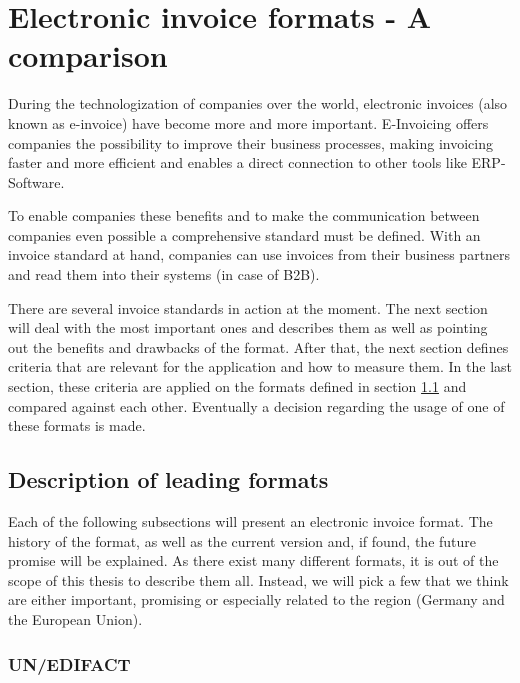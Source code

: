 %
% 
\chapter{Electronic invoice formats - A comparison}
\label{cha2}

During the technologization of companies over the world, electronic invoices (also known as e-invoice) have become more and more important. E-Invoicing offers companies the possibility to improve their business processes, making invoicing faster and more efficient and enables a direct connection to other tools like ERP-Software. 

To enable companies these benefits and to make the communication between companies even possible a comprehensive standard must be defined. With an invoice standard at hand, companies can use invoices from their business partners and read them into their systems (in case of B2B). 

There are several invoice standards in action at the moment. The next section will deal with the most important ones and describes them as well as pointing out the benefits and drawbacks of the format.
After that, the next section defines criteria that are relevant for the application and how to measure them.
In the last section, these criteria are applied on the formats defined in section \ref{sec2.1} and compared against each other. Eventually a decision regarding the usage of one of these formats is made.

\section{Description of leading formats}
\label{sec2.1}

Each of the following subsections will present an electronic invoice format. The history of the format, as well as the current version and, if found, the future promise will be explained. As there exist many different formats, it is out of the scope of this thesis to describe them all. Instead, we will pick a few that we think are either important, promising or especially related to the region (Germany and the European Union).

\subsection{UN/EDIFACT}
\label{sec2.1.1}

